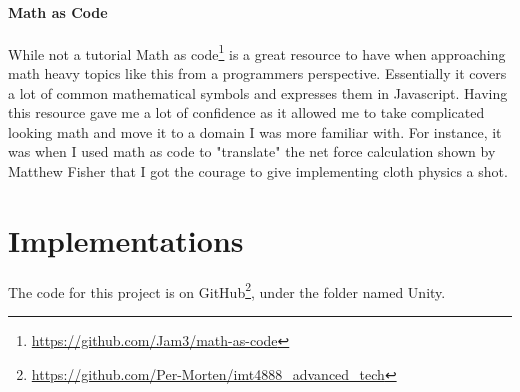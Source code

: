 \paragraph{Math as Code}
While not a tutorial Math as code\footnote{\url{https://github.com/Jam3/math-as-code}} is a great resource to have when approaching math heavy topics like this from a programmers perspective.
Essentially it covers a lot of common mathematical symbols and expresses them in Javascript. 
Having this resource gave me a lot of confidence as it allowed me to take complicated looking math and move it to a domain I was more familiar with.
For instance, it was when I used math as code to "translate" the net force calculation shown by Matthew Fisher\cite{matthew_fisher} that I got the courage to give implementing cloth physics a shot.

\section{Implementations}
The code for this project is on GitHub\footnote{\url{https://github.com/Per-Morten/imt4888_advanced_tech}}, under the folder named Unity.


